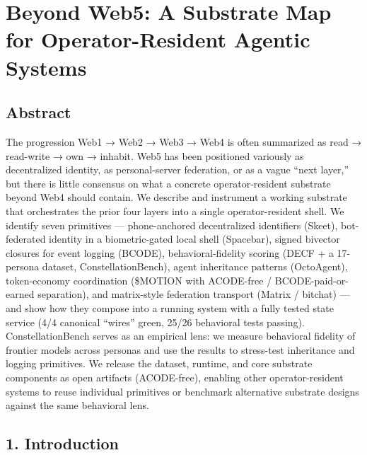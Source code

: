 \section{Beyond Web5: A Substrate Map for Operator-Resident Agentic
Systems}\label{beyond-web5-a-substrate-map-for-operator-resident-agentic-systems}

\subsection{Abstract}\label{abstract}

The progression Web1 → Web2 → Web3 → Web4 is often summarized as read →
read-write → own → inhabit. Web5 has been positioned variously as
decentralized identity, as personal-server federation, or as a vague
``next layer,'' but there is little consensus on what a concrete
operator-resident substrate beyond Web4 should contain. We describe and
instrument a working substrate that orchestrates the prior four layers
into a single operator-resident shell. We identify seven primitives ---
phone-anchored decentralized identifiers (Skeet), bot-federated identity
in a biometric-gated local shell (Spacebar), signed bivector closures
for event logging (BCODE), behavioral-fidelity scoring (DECF + a
17-persona dataset, ConstellationBench), agent inheritance patterns
(OctoAgent), token-economy coordination (\$MOTION with ACODE-free /
BCODE-paid-or-earned separation), and matrix-style federation transport
(Matrix / bitchat) --- and show how they compose into a running system
with a fully tested state service (4/4 canonical ``wires'' green, 25/26
behavioral tests passing). ConstellationBench serves as an empirical
lens: we measure behavioral fidelity of frontier models across personas
and use the results to stress-test inheritance and logging primitives.
We release the dataset, runtime, and core substrate components as open
artifacts (ACODE-free), enabling other operator-resident systems to
reuse individual primitives or benchmark alternative substrate designs
against the same behavioral lens.

\subsection{1. Introduction}\label{introduction}

